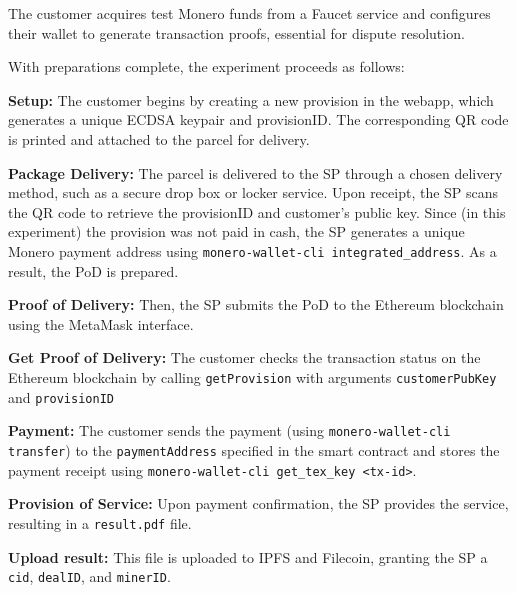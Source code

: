 \documentclass[pdftex,twocolumn,epjc3]{svjour3}
\begin{document}
The customer acquires test Monero funds from a Faucet service and configures their wallet to generate transaction proofs, essential for dispute resolution.

With preparations complete, the experiment proceeds as follows:

\begin{enumerate}
  \setcounter{enumi}{-1}
  \item \textbf{Setup:} The customer begins by creating a new provision in the webapp, which generates a unique ECDSA keypair and provisionID. The corresponding QR code is printed and attached to the parcel for delivery.
  
  \item  \textbf{Package Delivery:}  The parcel is delivered to the SP through a chosen delivery method, such as a secure drop box or locker service. Upon receipt, the SP scans the QR code to retrieve the provisionID and customer's public key. Since (in this experiment) the provision was not paid in cash, the SP generates a unique Monero payment address using \texttt{monero-wallet-cli integrated\_address}. As a result, the PoD is prepared.

  \item \textbf{Proof of Delivery:} Then, the SP submits the PoD to the Ethereum blockchain using the MetaMask interface.

    \item \textbf{Get Proof of Delivery:} The customer checks the transaction status on the Ethereum blockchain by calling \texttt{getProvision} with arguments \texttt{customerPubKey} and \texttt{provisionID}

    \begin{sloppypar}
    \item \textbf{Payment:} The customer sends the payment (using \texttt{monero-wallet-cli transfer}) to the \texttt{paymentAddress} specified in the smart contract and stores the payment receipt using \texttt{monero-wallet-cli get\_tex\_key <tx-id>}.
    \end{sloppypar}
  
    \item \textbf{Provision of Service:} Upon payment confirmation, the SP provides the service, resulting in a \texttt{result.pdf} file.

  \item \textbf{Upload result:} This file is uploaded to IPFS and Filecoin, granting the SP a \texttt{cid}, \texttt{dealID}, and \texttt{minerID}.


\end{enumerate}
\end{document}
